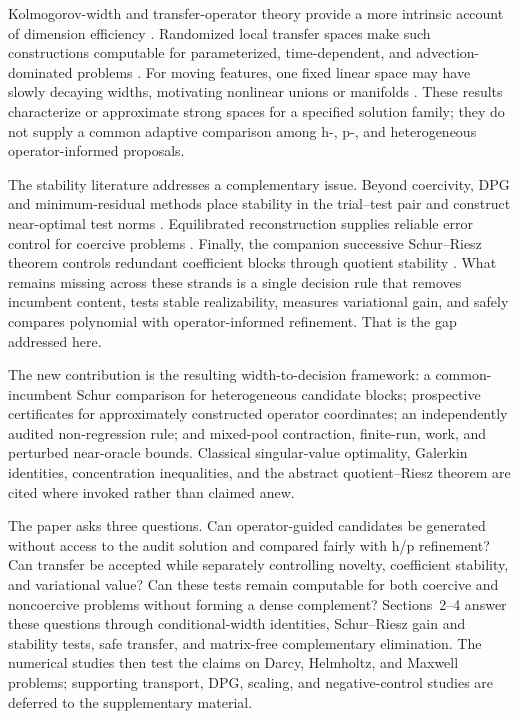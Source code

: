 \documentclass[11pt]{article}
\numberwithin{algorithm}{section}
\theoremstyle{definition}\newtheorem{definition}[theorem]{Definition}
\theoremstyle{remark}\newtheorem{remark}[theorem]{Remark}
\begin{document}
Kolmogorov-width and transfer-operator theory provide a more intrinsic account
of dimension efficiency \cite{pinkus1985,babuskalipton2011}.  Randomized local
transfer spaces make such constructions computable for parameterized,
time-dependent, and advection-dominated problems
\cite{schleusssmetanatermaat2023}.  For moving features, one fixed linear space
may have slowly decaying widths, motivating nonlinear unions or manifolds
\cite{cohendahmenmula2022}.  These results characterize or approximate strong
spaces for a specified solution family; they do not supply a common adaptive
comparison among h-, p-, and heterogeneous operator-informed proposals.

The stability literature addresses a complementary issue.  Beyond coercivity,
DPG and minimum-residual methods place stability in the trial--test pair and
construct near-optimal test norms \cite{demkowiczgopalakrishnan2011,chanheuer2021}.
Equilibrated reconstruction supplies reliable error control for coercive
problems \cite{braessschoberl2008,ernvohralik2015}.  Finally, the companion
successive Schur--Riesz theorem controls redundant coefficient blocks through
quotient stability \cite{dixon2026schurriesz}.  What remains missing across
these strands is a single decision rule that removes incumbent content,
tests stable realizability, measures variational gain, and safely compares
polynomial with operator-informed refinement.  That is the gap addressed here.

The new contribution is the resulting width-to-decision framework: a
common-incumbent Schur comparison for heterogeneous candidate blocks;
prospective certificates for approximately constructed operator coordinates;
an independently audited non-regression rule; and mixed-pool contraction,
finite-run, work, and perturbed near-oracle bounds.  Classical singular-value
optimality, Galerkin identities, concentration inequalities, and the abstract
quotient--Riesz theorem are cited where invoked rather than claimed anew.

The paper asks three questions.  Can operator-guided candidates be generated
without access to the audit solution and compared fairly with h/p refinement?
Can transfer be accepted while separately controlling novelty, coefficient
stability, and variational value?  Can these tests remain computable for both
coercive and noncoercive problems without forming a dense complement?
Sections~2--4 answer these questions through conditional-width identities,
Schur--Riesz gain and stability tests, safe transfer, and matrix-free
complementary elimination.  The numerical studies then test the claims on
Darcy, Helmholtz, and Maxwell problems; supporting transport, DPG, scaling,
and negative-control studies are deferred to the supplementary material.
\end{document}
